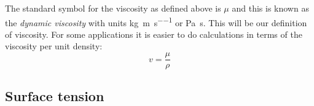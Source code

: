 \documentclass[class=report, crop=false, 12pt,a4paper]{standalone}
\begin{document}
The standard symbol for the viscosity as defined above is \( \mu \) and this is known as the \emph{dynamic viscosity} with units \si{\kg\per\meter\per\second} or \si{\pascal \second}. This will be our definition of viscosity. For some applications it is easier to do calculations in terms of the viscosity per unit density:
\begin{equation}
  v = \frac{\mu}{\rho}
\end{equation}

\subsection{Surface tension}
\end{document}
